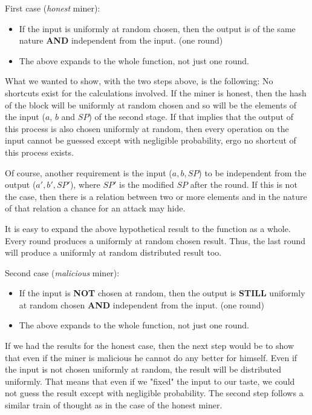 First case (\emph{honest} miner):
\begin{itemize}
  \item If the input is uniformly at random chosen, then the output is of the same nature \textbf{AND} independent from the input. (one round)
  \item The above expands to the whole function, not just one round.
\end{itemize}

What we wanted to show, with the two steps above, is the following: No shortcuts exist for the calculations involved. If the miner is honest, then the hash of the block will be uniformly at random chosen and so will be the elements of the input ($a$, $b$ and $SP$) of the second stage. If that implies that the output of this process is also chosen uniformly at random, then every operation on the input cannot be guessed except with negligible probability, ergo no shortcut of this process exists.

Of course, another requirement is the input ($a,b,SP$) to be independent from the output ($a',b',SP'$), where $SP'$ is the modified $SP$ after the round. If this is not the case, then there is a relation between two or more elements and in the nature of that relation a chance for an attack may hide.

It is easy to expand the above hypothetical result to the function as a whole. Every round produces a uniformly at random chosen result. Thus, the last round will produce a uniformly at random distributed result too.

Second case (\emph{malicious} miner):
\begin{itemize}
  \item If the input is \textbf{NOT} chosen at random, then the output is \textbf{STILL} uniformly at random chosen \textbf{AND} independent from the input. (one round)
  \item The above expands to the whole function, not just one round.
\end{itemize}

If we had the results for the honest case, then the next step would be to show that even if the miner is malicious he cannot do any better for himself. Even if the input is not chosen uniformly at random, the result will be distributed uniformly. That means that even if we "fixed" the input to our taste, we could not guess the result except with negligible probability. The second step follows a similar train of thought as in the case of the honest miner.

